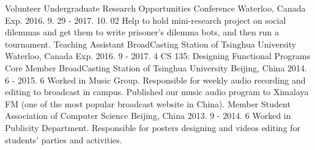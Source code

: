 \begin{cventries}
   \cventry
    {Volunteer}
    {Undergraduate Research Opportunities Conference}
    {Waterloo, Canada}
    {Exp. 2016. 9. 29 - 2017. 10. 02}
    {Help to hold mini-research project on social dilemmas and get them to write prisoner's dilemma bots, and then run a tournament.}
  \cventry
    {Teaching Assistant}
    {BroadCasting Station of Tsinghua University}
    {Waterloo, Canada}
    {Exp. 2016. 9 - 2017. 4}
    {CS 135: Designing Functional Programs}
  \cventry
    {Core Member}
    {BroadCasting Station of Tsinghua University}
    {Beijing, China}
    {2014. 6 - 2015. 6}
    {Worked in Music Group. Responsible for weekly audio recording and editing to broadcast in campus. Published our music audio program to Ximalaya FM (one of the most popular broadcast website in China).}
  \cventry
    {Member}
    {Student Association of Computer Science}
    {Beijing, China}
    {2013. 9 - 2014. 6}
    {Worked in Publicity Department. Responsible for posters designing and videos editing for students' parties and activities.}
\end{cventries}
